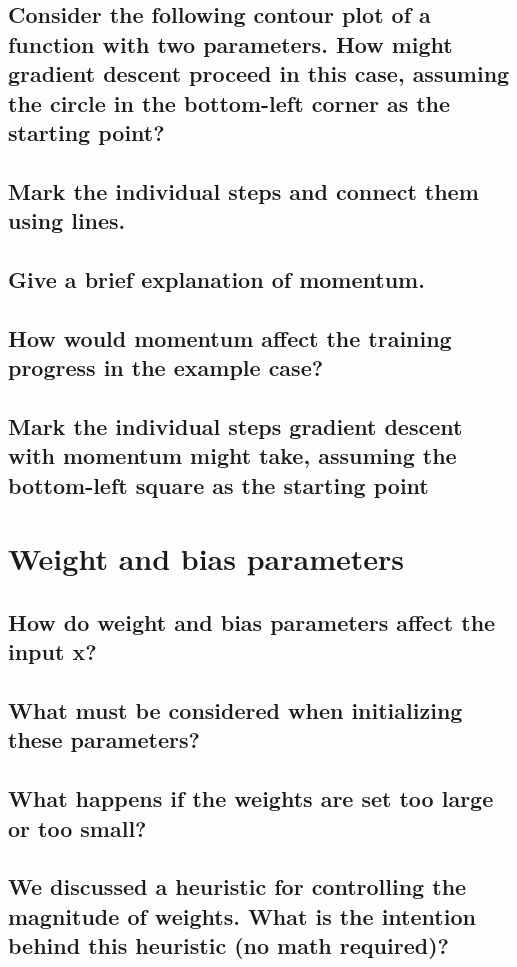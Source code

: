 \subsection{Consider the following contour plot of a function with two parameters. How might gradient descent proceed in this case, assuming the circle in the bottom-left corner as the starting point?}
\subsection{Mark the individual steps and connect them using lines.}
\subsection{Give a brief explanation of momentum.}
\subsection{How would momentum affect the training progress in the example case?}
\subsection{Mark the individual steps gradient descent with momentum might take, assuming the bottom-left square as the starting point}

\section{Weight and bias parameters}
\subsection{How do weight and bias parameters affect the input x?}
\subsection{What must be considered when initializing these parameters?}
\subsection{What happens if the weights are set too large or too small?}
\subsection{We discussed a heuristic for controlling the magnitude of weights. What is the intention behind this heuristic (no math required)?}

